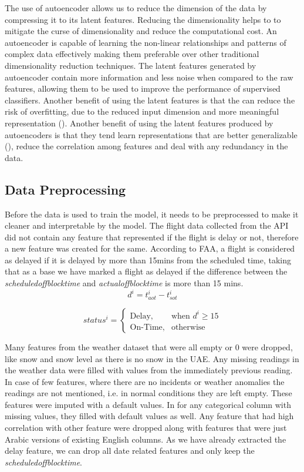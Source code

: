 \documentclass[twoside,11pt]{article}
\begin{document}
The use of autoencoder allows us to reduce the dimension of the data by compressing it to its latent features. Reducing the dimensionality helps to to mitigate the curse of dimensionality and reduce the computational cost. An autoencoder is capable of learning the non-linear relationships and patterns of complex data effectively making them preferable over other traditional dimensionality reduction techniques. The latent features generated by autoencoder contain more information and less noise when compared to the raw features, allowing them to be used to improve the performance of supervised classifiers. Another benefit of using the latent features is that the can reduce the risk of overfitting, due to the reduced input dimension and more meaningful representation (\citealp{berahmandAutoencodersTheirApplications2024}). Another benefit of using the latent features produced by autoencoders is that they tend learn representations that are better generalizable (\citealp{gabdullinLatentSpaceConfiguration2024}), reduce the correlation among features and deal with any redundancy in the data.

\subsection{Data Preprocessing}
Before the data is used to train the model, it needs to be preprocessed to make it cleaner and interpretable by the model. The flight data collected from the API did not contain any feature that represented if the flight is delay or not, therefore a new feature was created for the same. According to FAA, a flight is considered as delayed if it is delayed by more than 15mins from the scheduled time, taking that as a base we have marked a flight as delayed if the difference between the \emph{scheduledoffblocktime} and \emph{actualoffblocktime} is more than 15 mins.
\[
  d^i = t_{aot}^i - t_{sot}^i
  \]

\[
  status^i = \begin{cases}
      \text{Delay}, & \text{when }  d^i\geq 15\\
      \text{On-Time}, & \text{otherwise}
      \end{cases}
\]

Many features from the weather dataset that were all empty or 0 were dropped, like snow and snow level as there is no snow in the UAE. Any missing readings in the weather data were filled with values from the immediately previous reading. In case of few features, where there are no incidents or weather anomalies the readings are not mentioned, i.e. in normal conditions they are left empty. These features were imputed with a default values. In for any categorical column with missing values, they filled with default values as well. Any feature that had high correlation with other feature were dropped along with features that were just Arabic versions of existing English columns. As we have already extracted the delay feature, we can drop all date related features and only keep the \emph{scheduledoffblocktime}. 
\end{document}
